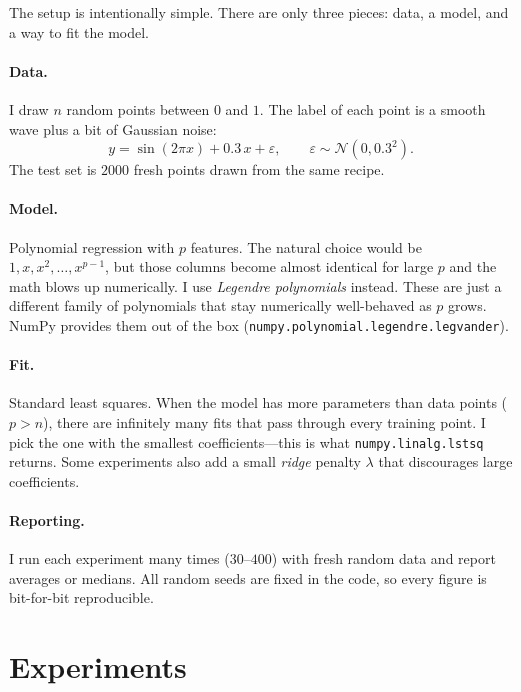 \documentclass[11pt]{article}
\begin{document}
The setup is intentionally simple. There are only three pieces:
data, a model, and a way to fit the model.

\paragraph{Data.} I draw $n$ random points between $0$ and $1$.
The label of each point is a smooth wave plus a bit of Gaussian
noise:
\begin{equation}
  y = \sin(2\pi x) + 0.3\,x + \varepsilon,
  \qquad \varepsilon \sim \mathcal{N}(0, 0.3^2).
  \label{eq:data}
\end{equation}
The test set is $2000$ fresh points drawn from the same recipe.

\paragraph{Model.} Polynomial regression with $p$ features. The
natural choice would be $1, x, x^2, \ldots, x^{p-1}$, but those
columns become almost identical for large $p$ and the math blows up
numerically. I use \emph{Legendre polynomials} instead. These are
just a different family of polynomials that stay numerically
well-behaved as $p$ grows. NumPy provides them out of the box
(\texttt{numpy.polynomial.legendre.legvander}).

\paragraph{Fit.} Standard least squares. When the model has more
parameters than data points ($p > n$), there are infinitely many
fits that pass through every training point. I pick the one with the
smallest coefficients---this is what \texttt{numpy.linalg.lstsq}
returns. Some experiments also add a small \emph{ridge} penalty
$\lambda$ that discourages large coefficients.

\paragraph{Reporting.} I run each experiment many times
($30$--$400$) with fresh random data and report averages or
medians. All random seeds are fixed in the code, so every figure is
bit-for-bit reproducible.

\section{Experiments}
\label{sec:experiments}
\end{document}
